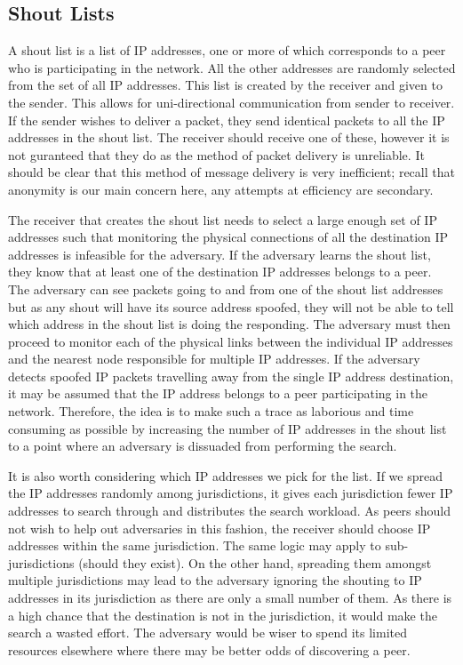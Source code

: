 \documentclass[ %
                    author={Luke Murray},
                supervisor={Dr. Simon Hollis},
                     title={Shadow Peer-to-Peer Networks},
                  subtitle={},
                    degree={MEng},
                      year={2013} ]{thesis}
\begin{document}
\subsection{Shout Lists}

A shout list is a list of IP addresses, one or more of which corresponds to a peer who is participating in the network. All the other addresses are randomly selected from the set of all IP addresses. This list is created by the receiver and given to the sender. This allows for uni-directional communication from sender to receiver. If the sender wishes to deliver a packet, they send identical packets to all the IP addresses in the shout list. The receiver should receive one of these, however it is not guranteed that they do as the method of packet delivery is unreliable. It should be clear that this method of message delivery is very inefficient; recall that anonymity is our main concern here, any attempts at efficiency are secondary.

The receiver that creates the shout list needs to select a large enough set of IP addresses such that monitoring the physical connections of all the destination IP addresses is infeasible for the adversary. If the adversary learns the shout list, they know that at least one of the destination IP addresses belongs to a peer. The adversary can see packets going to and from one of the shout list addresses but as any shout will have its source address spoofed, they will not be able to tell which address in the shout list is doing the responding. The adversary must then proceed to monitor each of the physical links between the individual IP addresses and the nearest node responsible for multiple IP addresses. If the adversary detects spoofed IP packets travelling away from the single IP address destination, it may be assumed that the IP address belongs to a peer participating in the network. Therefore, the idea is to make such a trace as laborious and time consuming as possible by increasing the number of IP addresses in the shout list to a point where an adversary is dissuaded from performing the search.

It is also worth considering which IP addresses we pick for the list. If we spread the IP addresses randomly among jurisdictions, it gives each jurisdiction fewer IP addresses to search through and distributes the search workload. As peers should not wish to help out adversaries in this fashion, the receiver should choose IP addresses within the same jurisdiction. The same logic may apply to sub-jurisdictions (should they exist). On the other hand, spreading them amongst multiple jurisdictions may lead to the adversary ignoring the shouting to IP addresses in its jurisdiction as there are only a small number of them. As there is a high chance that the destination is not in the jurisdiction, it would make the search a wasted effort. The adversary would be wiser to spend its limited resources elsewhere where there may be better odds of discovering a peer.
\end{document}
